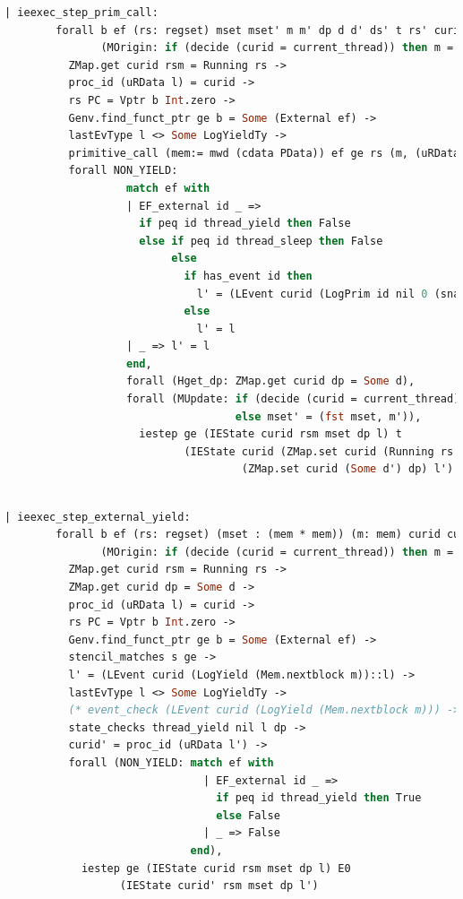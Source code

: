 \begin{lstlisting}[language=Caml]
    | ieexec_step_prim_call:
        forall b ef (rs: regset) mset mset' m m' dp d d' ds' t rs' curid rsm l l'
               (MOrigin: if (decide (curid = current_thread)) then m = fst mset else m = snd mset),
          ZMap.get curid rsm = Running rs ->
          proc_id (uRData l) = curid ->
          rs PC = Vptr b Int.zero ->
          Genv.find_funct_ptr ge b = Some (External ef) ->
          lastEvType l <> Some LogYieldTy ->
          primitive_call (mem:= mwd (cdata PData)) ef ge rs (m, (uRData l, d)) t rs' (m', (ds', d')) ->
          forall NON_YIELD: 
                   match ef with
                   | EF_external id _ => 
                     if peq id thread_yield then False
                     else if peq id thread_sleep then False
                          else
                            if has_event id then
                              l' = (LEvent curid (LogPrim id nil 0 (snap_func d)) :: l)
                            else
                              l' = l
                   | _ => l' = l
                   end,
                   forall (Hget_dp: ZMap.get curid dp = Some d),
                   forall (MUpdate: if (decide (curid = current_thread)) then mset' = (m', snd mset)
                                    else mset' = (fst mset, m')),
                     iestep ge (IEState curid rsm mset dp l) t 
                            (IEState curid (ZMap.set curid (Running rs') rsm) mset' 
                                     (ZMap.set curid (Some d') dp) l')
                            
\end{lstlisting}

\begin{lstlisting}[language=Caml]
    | ieexec_step_external_yield:
        forall b ef (rs: regset) (mset : (mem * mem)) (m: mem) curid curid' rsm s l l' dp d
               (MOrigin: if (decide (curid = current_thread)) then m = fst mset else m = snd mset),
          ZMap.get curid rsm = Running rs ->
          ZMap.get curid dp = Some d ->
          proc_id (uRData l) = curid ->
          rs PC = Vptr b Int.zero ->
          Genv.find_funct_ptr ge b = Some (External ef) ->
          stencil_matches s ge ->
          l' = (LEvent curid (LogYield (Mem.nextblock m))::l) ->
          lastEvType l <> Some LogYieldTy ->
          (* event_check (LEvent curid (LogYield (Mem.nextblock m))) -> *)
          state_checks thread_yield nil l dp ->
          curid' = proc_id (uRData l') ->
          forall (NON_YIELD: match ef with
                               | EF_external id _ => 
                                 if peq id thread_yield then True
                                 else False
                               | _ => False
                             end),
            iestep ge (IEState curid rsm mset dp l) E0
                  (IEState curid' rsm mset dp l')

\end{lstlisting}

